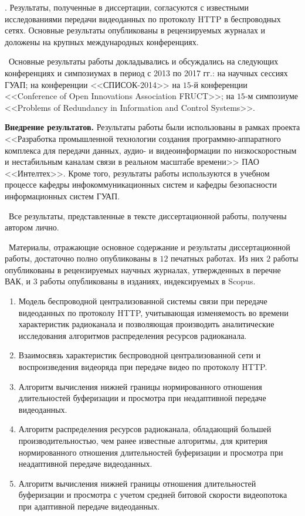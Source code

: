 \reliability. Результаты, полученные в диссертации, согласуются с известными исследованиями передачи видеоданных по протоколу HTTP в беспроводных сетях. Основные результаты опубликованы в рецензируемых журналах и доложены на крупных международных конференциях.

\probation\ Основные результаты работы докладывались и обсуждались на следующих конференциях и симпозиумах в период с 2013 по 2017 гг.: на научных сессиях ГУАП; на конференции <<СПИСОК-2014>> на $15$-й конференции <<Conference of Open Innovations Association FRUCT>>; на $15$-м симпозиуме <<Problems of Redundancy in Information and Control Systems>>.

\textbf{Внедрение результатов.} Результаты работы были использованы в рамках проекта <<Разработка промышленной технологии создания программно-аппаратного комплекса для передачи данных, аудио- и видеоинформации по низкоскоростным и нестабильным каналам связи в реальном масштабе времени>> ПАО <<Интелтех>>. Кроме того, результаты работы используются в учебном процессе кафедры инфокоммуникационных систем и кафедры безопасности информационных систем ГУАП.

\contribution\ Все результаты, представленные в тексте диссертационной работы, получены автором лично.

\publications\ Материалы, отражающие основное содержание и результаты диссертационной работы, достаточно полно опубликованы в $12$ печатных работах. Из них $2$ работы опубликованы в рецензируемых научных журналах, утвержденных в перечне ВАК, и $3$ работы опубликованы в изданиях, индексируемых в Scopus.

\begin{enumerate}
    \item Модель беспроводной централизованной системы связи при передаче видеоданных по протоколу HTTP, учитывающая изменяемость во времени характеристик радиоканала и позволяющая производить аналитические исследования алгоритмов распределения ресурсов радиоканала.
    \item Взаимосвязь характеристик беспроводной централизованной сети и воспроизведения видеоряда при передаче видео по протоколу HTTP.
    \item Алгоритм вычисления нижней границы нормированного отношения длительностей буферизации и просмотра при неадаптивной передаче видеоданных.
    \item Алгоритм распределения ресурсов радиоканала, обладающий большей производительностью, чем ранее известные алгоритмы, для критерия нормированного отношения длительностей буферизации и просмотра при неадаптивной передаче видеоданных.
    \item Алгоритм вычисления нижней границы отношения длительностей буферизации и просмотра с учетом средней битовой скорости видеопотока при адаптивной передаче видеоданных.
\end{enumerate}
